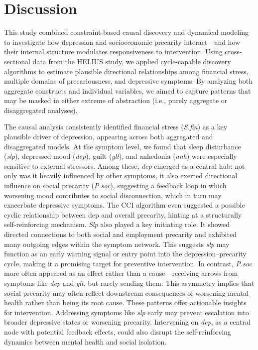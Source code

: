 \documentclass[
]{article}
\begin{document}
\section{Discussion}\label{discussion}

This study combined constraint-based causal discovery and dynamical
modeling to investigate how depression and socioeconomic precarity
interact---and how their internal structure modulates responsiveness to
intervention. Using cross-sectional data from the HELIUS study, we
applied cycle-capable discovery algorithms to estimate plausible
directional relationships among financial stress, multiple domains of
precariousness, and depressive symptoms. By analyzing both aggregate
constructs and individual variables, we aimed to capture patterns that
may be masked in either extreme of abstraction (i.e., purely aggregate
or disaggregated analyses).

The causal analysis consistently identified financial stress
(\emph{S.fin}) as a key plausible driver of depression, appearing across
both aggregated and disaggregated models. At the symptom level, we found
that sleep disturbance (\emph{slp}), depressed mood (\emph{dep}), guilt
(\emph{glt}), and anhedonia (\emph{anh}) were especially sensitive to
external stressors. Among these, \emph{dep} emerged as a central hub:
not only was it heavily influenced by other symptoms, it also exerted
directional influence on social precarity (\emph{P.soc}), suggesting a
feedback loop in which worsening mood contributes to social
disconnection, which in turn may exacerbate depressive symptoms. The CCI
algorithm even suggested a possible cyclic relationship between dep and
overall precarity, hinting at a structurally self-reinforcing mechanism.
\emph{Slp} also played a key initiating role. It showed directed
connections to both social and employment precarity and exhibited many
outgoing edges within the symptom network. This suggests \emph{slp} may
function as an early warning signal or entry point into the
depression--precarity cycle, making it a promising target for preventive
intervention. In contrast, \emph{P.soc} more often appeared as an effect
rather than a cause---receiving arrows from symptoms like \emph{dep} and
\emph{glt}, but rarely sending them. This asymmetry implies that social
precarity may often reflect downstream consequences of worsening mental
health rather than being its root cause. These patterns offer actionable
insights for intervention. Addressing symptoms like \emph{slp} early may
prevent escalation into broader depressive states or worsening
precarity. Intervening on \emph{dep}, as a central node with potential
feedback effects, could also disrupt the self-reinforcing dynamics
between mental health and social isolation.
\end{document}
